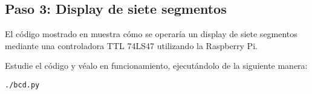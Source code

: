 %
%


\subsection{Paso 3: Display de siete segmentos}%
\label{sec:step4}
El código mostrado en  muestra cómo se operaría un display de siete segmentos mediante una controladora TTL 74LS47 utilizando la Raspberry Pi.

\smallskip

\smallskip

Estudie el código y véalo en funcionamiento, ejecutándolo de la siguiente manera:
\begin{Verbatim}[fontsize=\footnotesize]
./bcd.py
\end{Verbatim}

